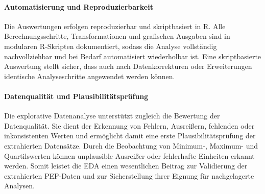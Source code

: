 \paragraph{Automatisierung und Reproduzierbarkeit}
Die Auswertungen erfolgen reproduzierbar und skriptbasiert in R. 
Alle Berechnungsschritte, Transformationen und grafischen Ausgaben sind in modularen R-Skripten dokumentiert, 
sodass die Analyse vollständig nachvollziehbar und bei Bedarf automatisiert wiederholbar ist. 
Eine skriptbasierte Auswertung stellt sicher, dass auch nach Datenkorrekturen oder Erweiterungen identische Analyseschritte angewendet werden können.

\paragraph{Datenqualität und Plausibilitätsprüfung}
Die explorative Datenanalyse unterstützt zugleich die Bewertung der Datenqualität. 
Sie dient der Erkennung von Fehlern, Ausreißern, fehlenden oder inkonsistenten Werten 
und ermöglicht damit eine erste Plausibilitätsprüfung der extrahierten Datensätze. 
Durch die Beobachtung von Minimum-, Maximum- und Quartilswerten können unplausible Ausreißer oder fehlerhafte Einheiten erkannt werden. 
Somit leistet die EDA einen wesentlichen Beitrag zur Validierung der extrahierten PEP-Daten 
und zur Sicherstellung ihrer Eignung für nachgelagerte Analysen.

